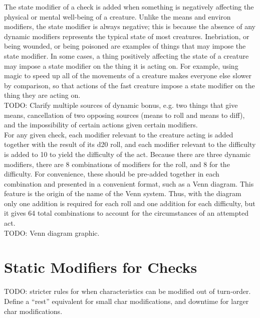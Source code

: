 \documentclass[letterpaper,titlepage,openany,twocolumn]{book}
\begin{document}
The state modifier of a check is added when something is negatively affecting the physical or mental well-being of a creature. Unlike the means and environ modifiers, the state modifier is always negative; this is because the absence of any dynamic modifiers represents the typical state of most creatures. Inebriation, or being wounded, or being poisoned are examples of things that may impose the state modifier. In some cases, a thing positively affecting the state of a creature may impose a state modifier on the thing it is acting on. For example, using magic to speed up all of the movements of a creature makes everyone else slower by comparison, so that actions of the fast creature impose a state modifier on the thing they are acting on.\\
TODO: Clarify multiple sources of dynamic bonus, e.g. two things that give means, cancellation of two opposing sources (means to roll and means to diff), and the impossibility of certain actions given certain modifiers.\\

For any given check, each modifier relevant to the creature acting is added together with the result of its d20 roll, and each modifier relevant to the difficulty is added to 10 to yield the difficulty of the act. Because there are three dynamic modifiers, there are 8 combinations of modifiers for the roll, and 8 for the difficulty. For convenience, these should be pre-added together in each combination and presented in a convenient format, such as a Venn diagram. This feature is the origin of the name of the Venn system. Thus, with the diagram only one addition is required for each roll and one addition for each difficulty, but it gives 64 total combinations to account for the circumstances of an attempted act.\\
TODO: Venn diagram graphic.\\

\section{Static Modifiers for Checks}
TODO: stricter rules for when characteristics can be modified out of turn-order. Define a “rest” equivalent for small char modifications, and downtime for larger char modifications.\\
\end{document}
